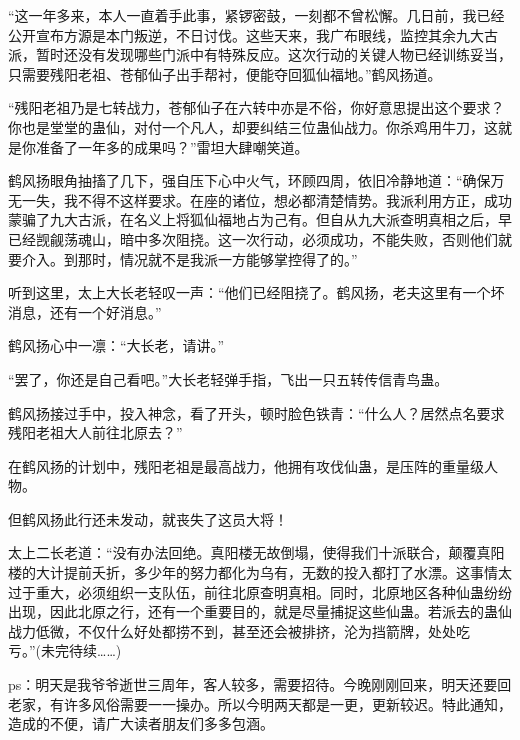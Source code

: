 \begin{this_body}
“这一年多来，本人一直着手此事，紧锣密鼓，一刻都不曾松懈。几日前，我已经公开宣布方源是本门叛逆，不日讨伐。这些天来，我广布眼线，监控其余九大古派，暂时还没有发现哪些门派中有特殊反应。这次行动的关键人物已经训练妥当，只需要残阳老祖、苍郁仙子出手帮衬，便能夺回狐仙福地。”鹤风扬道。

“残阳老祖乃是七转战力，苍郁仙子在六转中亦是不俗，你好意思提出这个要求？你也是堂堂的蛊仙，对付一个凡人，却要纠结三位蛊仙战力。你杀鸡用牛刀，这就是你准备了一年多的成果吗？”雷坦大肆嘲笑道。

鹤风扬眼角抽搐了几下，强自压下心中火气，环顾四周，依旧冷静地道：“确保万无一失，我不得不这样要求。在座的诸位，想必都清楚情势。我派利用方正，成功蒙骗了九大古派，在名义上将狐仙福地占为己有。但自从九大派查明真相之后，早已经觊觎荡魂山，暗中多次阻挠。这一次行动，必须成功，不能失败，否则他们就要介入。到那时，情况就不是我派一方能够掌控得了的。”

听到这里，太上大长老轻叹一声：“他们已经阻挠了。鹤风扬，老夫这里有一个坏消息，还有一个好消息。”

鹤风扬心中一凛：“大长老，请讲。”

“罢了，你还是自己看吧。”大长老轻弹手指，飞出一只五转传信青鸟蛊。

鹤风扬接过手中，投入神念，看了开头，顿时脸色铁青：“什么人？居然点名要求残阳老祖大人前往北原去？”

在鹤风扬的计划中，残阳老祖是最高战力，他拥有攻伐仙蛊，是压阵的重量级人物。

但鹤风扬此行还未发动，就丧失了这员大将！

太上二长老道：“没有办法回绝。真阳楼无故倒塌，使得我们十派联合，颠覆真阳楼的大计提前夭折，多少年的努力都化为乌有，无数的投入都打了水漂。这事情太过于重大，必须组织一支队伍，前往北原查明真相。同时，北原地区各种仙蛊纷纷出现，因此北原之行，还有一个重要目的，就是尽量捕捉这些仙蛊。若派去的蛊仙战力低微，不仅什么好处都捞不到，甚至还会被排挤，沦为挡箭牌，处处吃亏。”(未完待续……)

ps：明天是我爷爷逝世三周年，客人较多，需要招待。今晚刚刚回来，明天还要回老家，有许多风俗需要一一操办。所以今明两天都是一更，更新较迟。特此通知，造成的不便，请广大读者朋友们多多包涵。

\end{this_body}

